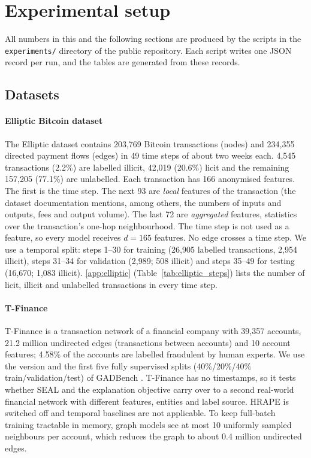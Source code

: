 \section{Experimental setup}
\label{sec:setup}

All numbers in this and the following sections are produced by the scripts in the \texttt{experiments/} directory of the public repository. Each script writes one JSON record per run, and the tables are generated from these records.

\subsection{Datasets}
\label{subsec:datasets}

\paragraph{Elliptic Bitcoin dataset} The Elliptic dataset \citep{weber2019anti} contains 203,769 Bitcoin transactions (nodes) and 234,355 directed payment flows (edges) in 49 time steps of about two weeks each. 4,545 transactions (2.2\%) are labelled illicit, 42,019 (20.6\%) licit and the remaining 157,205 (77.1\%) are unlabelled. Each transaction has 166 anonymised features. The first is the time step. The next 93 are \emph{local} features of the transaction (the dataset documentation mentions, among others, the numbers of inputs and outputs, fees and output volume). The last 72 are \emph{aggregated} features, statistics over the transaction's one-hop neighbourhood. The time step is not used as a feature, so every model receives $d=165$ features. No edge crosses a time step. We use a temporal split: steps 1--30 for training (26,905 labelled transactions, 2,954 illicit), steps 31--34 for validation (2,989; 508 illicit) and steps 35--49 for testing (16,670; 1,083 illicit). \ref{app:elliptic} (Table~\ref{tab:elliptic_steps}) lists the number of licit, illicit and unlabelled transactions in every time step.

\paragraph{T-Finance} T-Finance \citep{tang2022rethinking} is a transaction network of a financial company with 39,357 accounts, 21.2 million undirected edges (transactions between accounts) and 10 account features; 4.58\% of the accounts are labelled fraudulent by human experts. We use the version and the first five fully supervised splits (40\%/20\%/40\% train/validation/test) of GADBench \citep{tang2023gadbench}. T-Finance has no timestamps, so it tests whether SEAL and the explanation objective carry over to a second real-world financial network with different features, entities and label source. HRAPE is switched off and temporal baselines are not applicable. To keep full-batch training tractable in memory, graph models see at most 10 uniformly sampled neighbours per account, which reduces the graph to about 0.4 million undirected edges.

